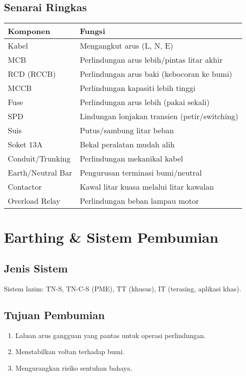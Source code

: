 \documentclass[12pt,a4paper,oneside]{scrreprt}
\begin{document}
\section{Senarai Ringkas}
\begin{longtable}{p{3cm}p{10cm}}
\toprule
\textbf{Komponen} & \textbf{Fungsi} \\
\midrule
Kabel & Mengangkut arus (L, N, E) \\
MCB & Perlindungan arus lebih/pintas litar akhir \\
RCD (RCCB) & Perlindungan arus baki (kebocoran ke bumi) \\
MCCB & Perlindungan kapasiti lebih tinggi \\
Fuse & Perlindungan arus lebih (pakai sekali) \\
SPD & Lindungan lonjakan transien (petir/switching) \\
Suis & Putus/sambung litar beban \\
Soket 13A & Bekal peralatan mudah alih \\
Conduit/Trunking & Perlindungan mekanikal kabel \\
Earth/Neutral Bar & Pengurusan terminasi bumi/neutral \\
Contactor & Kawal litar kuasa melalui litar kawalan \\
Overload Relay & Perlindungan beban lampau motor \\
\bottomrule
\end{longtable}

\chapter{Earthing \& Sistem Pembumian}
\section{Jenis Sistem}
Sistem lazim: TN-S, TN-C-S (PME), TT (khusus), IT (terasing, aplikasi khas).
\section{Tujuan Pembumian}
\begin{enumerate}
  \item Laluan arus gangguan yang pantas untuk operasi perlindungan.
  \item Menstabilkan voltan terhadap bumi.
  \item Mengurangkan risiko sentuhan bahaya.
\end{enumerate}
\end{document}
